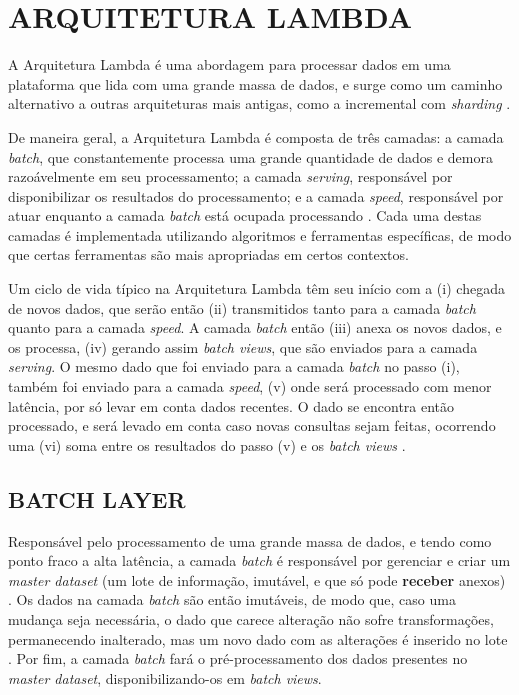 \chapter[ARQUITETURA LAMBDA]{ARQUITETURA LAMBDA}

A Arquitetura Lambda é uma abordagem para processar dados em uma plataforma
que lida com uma grande massa de dados, e surge como um caminho alternativo
a outras arquiteturas mais antigas, como a incremental com \textit{sharding}
\cite{marz2015}.

De maneira geral, a Arquitetura Lambda é composta de três camadas: a camada
\textit{batch}, que constantemente processa uma grande quantidade de dados e
demora razoávelmente em seu processamento; a camada \textit{serving},
responsável por disponibilizar os resultados do processamento; e a camada
\textit{speed}, responsável por atuar enquanto a camada \textit{batch} está
ocupada processando \cite{marz2015}. Cada uma destas camadas é implementada
utilizando algoritmos e ferramentas específicas, de modo que certas ferramentas
são mais apropriadas em certos contextos.

Um ciclo de vida típico na Arquitetura Lambda têm seu início com a (i) chegada
de novos dados, que serão então (ii) transmitidos tanto para a camada
\textit{batch} quanto para a camada \textit{speed}. A camada \textit{batch}
então (iii) anexa os novos dados, e os processa, (iv) gerando assim
\textit{batch views}, que são enviados para a camada \textit{serving}. O mesmo
dado que foi enviado para a camada \textit{batch} no passo (i), também foi
enviado para a camada \textit{speed}, (v) onde será processado com menor latência,
por só levar em conta dados recentes. O dado se encontra então processado, e
será levado em conta caso novas consultas sejam feitas, ocorrendo uma (vi) soma
entre os resultados do passo (v) e os \textit{batch views} \cite{marz2015}.

\section{BATCH LAYER}

Responsável pelo processamento de uma grande massa de dados, e tendo como ponto
fraco a alta latência, a camada \textit{batch} é responsável por gerenciar e
criar um \textit{master dataset} (um lote de informação, imutável, e que só
pode \textbf{receber} anexos) \cite{marz2015}. Os dados na camada \textit{batch}
são então imutáveis, de modo que, caso uma mudança seja necessária, o dado que
carece alteração não sofre transformações, permanecendo inalterado, mas um novo
dado com as alterações é inserido no lote \cite{marz2015}. Por fim, a camada
\textit{batch} fará o pré-processamento dos dados presentes no
\textit{master dataset}, disponibilizando-os em \textit{batch views}.

